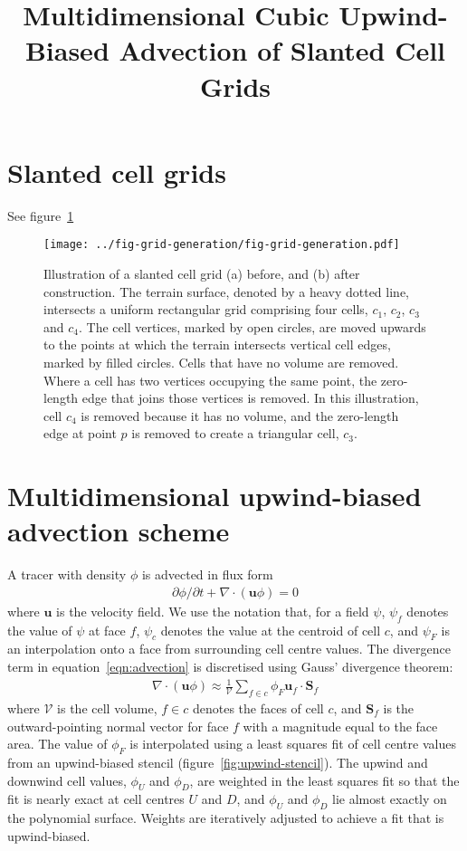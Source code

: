 \documentclass{article}
\title{Multidimensional Cubic Upwind-Biased Advection of Slanted Cell Grids}
\begin{document}
\maketitle

\section{Slanted cell grids}
See figure~\ref{fig:grid-generation}
\begin{figure}
	\centering
	\texttt{[image: ../fig-grid-generation/fig-grid-generation.pdf]}
	\caption{Illustration of a slanted cell grid (a) before, and (b) after construction.
	The terrain surface, denoted by a heavy dotted line, intersects a uniform rectangular grid comprising four cells, $c_1$, $c_2$, $c_3$ and $c_4$.  The cell vertices, marked by open circles, are moved upwards to the points at which the terrain intersects vertical cell edges, marked by filled circles.  Cells that have no volume are removed.  Where a cell has two vertices occupying the same point, the zero-length edge that joins those vertices is removed.  In this illustration, cell $c_4$ is removed because it has no volume, and the zero-length edge at point $p$ is removed to create a triangular cell, $c_3$.}
	\label{fig:grid-generation}
\end{figure}
\clearpage

\section{Multidimensional upwind-biased advection scheme}
A tracer with density $\phi$ is advected in flux form
\begin{align}
	\partial \phi / \partial t + \nabla \cdot \left( \mathbf{u} \phi \right) = 0 \label{eqn:advection}
\end{align}
where $\mathbf{u}$ is the velocity field.  We use the notation that, for a field $\psi$, $\psi_f$ denotes the value of $\psi$ at face $f$, $\psi_c$ denotes the value at the centroid of cell $c$, and $\psi_F$ is an interpolation onto a face from surrounding cell centre values.  The divergence term in equation~\ref{eqn:advection} is discretised using Gauss' divergence theorem:
\begin{align}
	\nabla \cdot \left( \mathbf{u} \phi \right) \approx \frac{1}{\mathcal{V}} \sum_{f \in c} \phi_F \mathbf{u}_f \cdot \mathbf{S}_f
\end{align}
where $\mathcal{V}$ is the cell volume, $f \in c$ denotes the faces of cell $c$, and $\mathbf{S}_f$ is the outward-pointing normal vector for face $f$ with a magnitude equal to the face area.
The value of $\phi_F$ is interpolated using a least squares fit of cell centre values from an upwind-biased stencil (figure~\ref{fig:upwind-stencil}).  The upwind and downwind cell values, $\phi_U$ and $\phi_D$, are weighted in the least squares fit so that the fit is nearly exact at cell centres $U$ and $D$, and $\phi_U$ and $\phi_D$ lie almost exactly on the polynomial surface.  Weights are iteratively adjusted to achieve a fit that is upwind-biased.
\end{document}

